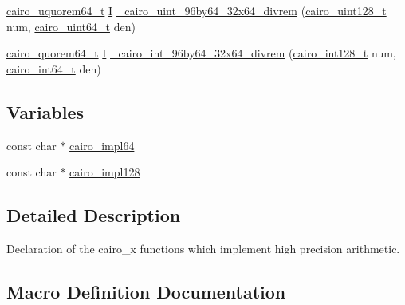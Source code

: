 \begin{DoxyCompactItemize}
\item 
\hyperlink{cairo-wideint-private_8h_aab2ad7e0f3441227d9339be2baa8b986}{cairo\+\_\+uquorem64\+\_\+t} \hyperlink{cairo-wideint-private_8h_a60ef6e1bcfabb95cfeb300e1d03ce470}{I} \hyperlink{cairo-wideint-private_8h_a81e4a553e5d49a4b6b9c09a6c2461cb8}{\+\_\+cairo\+\_\+uint\+\_\+96by64\+\_\+32x64\+\_\+divrem} (\hyperlink{cairo-wideint-private_8h_ab99b9c539c5f08b381ec3797b3fcd872}{cairo\+\_\+uint128\+\_\+t} num, \hyperlink{cairo-wideint-private_8h_addac97960d28a0f1b58a5abefd21b14b}{cairo\+\_\+uint64\+\_\+t} den)
\item 
\hyperlink{cairo-wideint-private_8h_af1cd8d1d4bd4c1ec92c27c22e8f0123b}{cairo\+\_\+quorem64\+\_\+t} \hyperlink{cairo-wideint-private_8h_a60ef6e1bcfabb95cfeb300e1d03ce470}{I} \hyperlink{cairo-wideint-private_8h_ae539a61ae4a94a282a79b70eaff3cbe1}{\+\_\+cairo\+\_\+int\+\_\+96by64\+\_\+32x64\+\_\+divrem} (\hyperlink{cairo-wideint-private_8h_adb77a91a0053b771957b37c1a822a228}{cairo\+\_\+int128\+\_\+t} num, \hyperlink{cairo-wideint-private_8h_a31b93307f43703e28eef43fad0166834}{cairo\+\_\+int64\+\_\+t} den)
\end{DoxyCompactItemize}
\subsection*{Variables}
\begin{DoxyCompactItemize}
\item 
const char $\ast$ \hyperlink{cairo-wideint-private_8h_a49cff5896e8f00bbdd461db2f8024ea1}{cairo\+\_\+impl64}
\item 
const char $\ast$ \hyperlink{cairo-wideint-private_8h_a660c34af82df7595e1a029af6c5f799f}{cairo\+\_\+impl128}
\end{DoxyCompactItemize}


\subsection{Detailed Description}
Declaration of the cairo\+\_\+x functions which implement high precision arithmetic. 

\subsection{Macro Definition Documentation}
